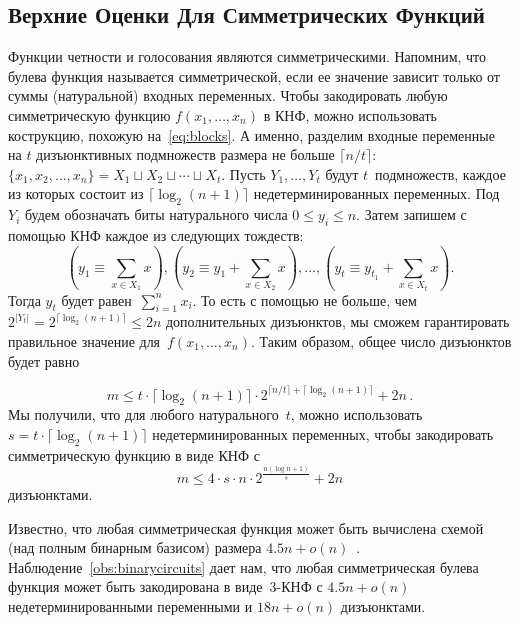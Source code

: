 \subsection{Верхние Оценки Для Симметрических Функций}\label{upperbound}
Функции четности и голосования являются симметрическими. Напомним, что
булева функция называется симметрической, если ее значение зависит только от суммы (натуральной) входных переменных.
Чтобы закодировать любую симметрическую функцию $f(x_1, \dotsc, x_n)$ в КНФ, можно использовать кострукцию, похожую на~\eqref{eq:blocks}. 
А именно, разделим входные переменные на $t$  дизъюнктивных подмножеств размера не больше $\lceil n/t \rceil$:
$\{x_1, x_2, \dotsc, x_n\}=X_1 \sqcup X_2 \sqcup \dotsb \sqcup X_{t}$.
Пусть $Y_1, \dotsc, Y_t$ будут $t$~подмножеств, каждое из которых состоит из $\lceil \log_2 (n+1) \rceil$ недетерминированных переменных.
Под $Y_i$ будем обозначать биты натурального числа $0 \le y_i \le n$.
Затем запишем с помощью КНФ каждое из следующих тождеств:
\[
\left(y_1 \equiv \sum_{x \in X_1}x\right),
\left(y_2 \equiv y_1+\sum_{x \in X_2}x\right), 
\dotsc,
\left(y_t \equiv y_{t_1}+\sum_{x \in X_t}x\right).
\]
Тогда $y_t$ будет равен~$\sum_{i=1}^nx_i$. То есть с помощью не больше, чем  
$2^{|Y_t|}=2^{\lceil \log_2 (n+1) \rceil} \le 2n$ дополнительных дизъюнктов, мы сможем гарантировать правильное значение для~$f(x_1, \dotsc, x_n)$.
Таким образом, общее число дизъюнктов будет равно

	\[m \le t \cdot \lceil \log_2 (n+1) \rceil \cdot 2^{\lceil n/t\rceil+ \lceil \log_2 (n+1) \rceil} + 2n \, .\]
Мы получили, что для любого натурального~$t$, можно использовать $s=t \cdot \lceil \log_2 (n+1) \rceil$ недетерминированных переменных, чтобы закодировать симметрическую функцию в виде КНФ с
	\[m \le 4 \cdot s \cdot n \cdot 2^{\frac{n (\log n + 1)}{s}} + 2n\]
дизъюнктами.

Известно, что любая симметрическая функция может быть вычислена схемой (над полным бинарным базисом)
размера $4.5n+o(n)$~\cite{DBLP:journals/ipl/DemenkovKKY10}.
Наблюдение~\ref{obs:binarycircuits} дает нам, что любая симметрическая булева функция может быть закодирована в виде~$3$-КНФ 
с $4.5n+o(n)$ недетерминированными переменными и 
$18n+o(n)$ дизъюнктами.
